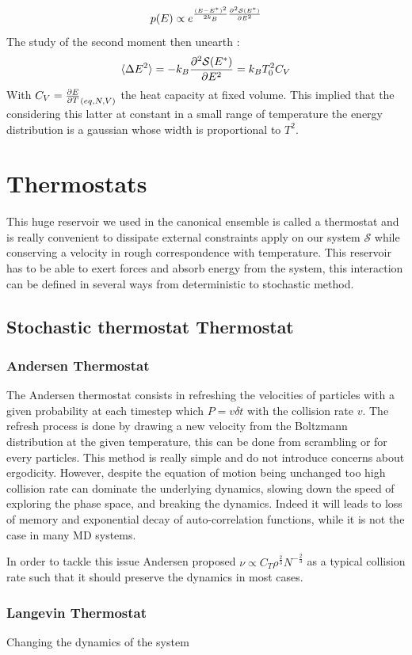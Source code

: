 \documentclass[ansiapaper]{report}
\begin{document}
\begin{multicols}{3}
$$ p(E) \propto e^{\frac{(E - E^*)^2}{2 k_B} \pdv[2]{\mathcal{S}(E^*)}{E}}$$
The study of the second moment then unearth : 
\begin{equation}
    \langle \Delta E^2 \rangle = - k_B \pdv[2]{\mathcal{S}(E^*)}{E} = k_B T_0^2C_V
    \label{eq:fluctuations_energy}
\end{equation}
With $C_V = \pdv{E}{T}_{(eq,N,V)}$ the heat capacity at fixed volume. This implied that the considering this latter at constant in a small range of temperature the energy distribution is a gaussian whose width is proportional to $T^2$.
\section{Thermostats}
This huge reservoir we used in the canonical ensemble is called a thermostat and is really convenient to dissipate external constraints apply on our system $\mathcal{S}$ while conserving a velocity in rough correspondence with temperature. This reservoir has to be able to exert forces and absorb energy from the system, this interaction can be defined in several ways from deterministic to stochastic method.
\subsection{Stochastic thermostat Thermostat}
\subsubsection{Andersen Thermostat}
The Andersen thermostat consists in refreshing the velocities of particles with a given probability at each timestep which $ P = v \delta t$ with the collision rate $v$. The refresh process is done by drawing a new velocity from the Boltzmann distribution at the given temperature, this can be done from scrambling or for every particles. This method is really simple and do not introduce concerns about ergodicity. However, despite the equation of motion being unchanged too high collision rate can dominate the underlying dynamics, slowing down the speed of exploring the phase space, and breaking the dynamics. Indeed it will leads to loss of memory and exponential decay of auto-correlation functions, while it is not the case in many MD systems.

In order to tackle this issue Andersen proposed $\nu \propto C_T \rho^{\frac{2}{3}}N^{-\frac{2}{3}}$ as a typical collision rate such that it should preserve the dynamics in most cases.
\subsubsection{Langevin Thermostat}
Changing the dynamics of the system 


\end{multicols}
\end{document}
